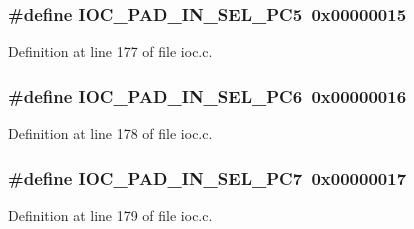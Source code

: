 \subsubsection[{\texorpdfstring{I\+O\+C\+\_\+\+P\+A\+D\+\_\+\+I\+N\+\_\+\+S\+E\+L\+\_\+\+P\+C5}{IOC_PAD_IN_SEL_PC5}}]{\setlength{\rightskip}{0pt plus 5cm}\#define I\+O\+C\+\_\+\+P\+A\+D\+\_\+\+I\+N\+\_\+\+S\+E\+L\+\_\+\+P\+C5~0x00000015}\hypertarget{group__ioc__api_ga7bdb0a6b28799db1f0b97056d72ffbbe}{}\label{group__ioc__api_ga7bdb0a6b28799db1f0b97056d72ffbbe}


Definition at line 177 of file ioc.\+c.

\subsubsection[{\texorpdfstring{I\+O\+C\+\_\+\+P\+A\+D\+\_\+\+I\+N\+\_\+\+S\+E\+L\+\_\+\+P\+C6}{IOC_PAD_IN_SEL_PC6}}]{\setlength{\rightskip}{0pt plus 5cm}\#define I\+O\+C\+\_\+\+P\+A\+D\+\_\+\+I\+N\+\_\+\+S\+E\+L\+\_\+\+P\+C6~0x00000016}\hypertarget{group__ioc__api_gaf77e2ef01a5e6920029a12681136a74f}{}\label{group__ioc__api_gaf77e2ef01a5e6920029a12681136a74f}


Definition at line 178 of file ioc.\+c.

\subsubsection[{\texorpdfstring{I\+O\+C\+\_\+\+P\+A\+D\+\_\+\+I\+N\+\_\+\+S\+E\+L\+\_\+\+P\+C7}{IOC_PAD_IN_SEL_PC7}}]{\setlength{\rightskip}{0pt plus 5cm}\#define I\+O\+C\+\_\+\+P\+A\+D\+\_\+\+I\+N\+\_\+\+S\+E\+L\+\_\+\+P\+C7~0x00000017}\hypertarget{group__ioc__api_gaf8c24e140a910194afa870bcf743dc75}{}\label{group__ioc__api_gaf8c24e140a910194afa870bcf743dc75}


Definition at line 179 of file ioc.\+c.

